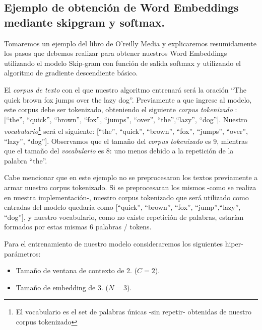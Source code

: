 \documentclass[12pt,a4paper]{article}
\begin{document}
\begin{sloppypar}

\cleardoublepage

\subsection{Ejemplo de obtención de Word Embeddings mediante skipgram y softmax.}\label{anexo_word_emb}

Tomaremos un ejemplo del libro de O’reilly Media\cite{NLP_26} y explicaremos resumidamente los pasos que debemos realizar para obtener nuestros Word Embeddings utilizando el modelo Skip-gram con función de salida softmax y utilizando el algoritmo de gradiente descendiente básico.

El \textit{corpus de texto} con el que nuestro algoritmo entrenará será la oración “The quick brown fox jumps over the lazy dog”. Previamente a que ingrese al modelo, este corpus debe ser tokenizado, obteniendo el siguiente \textit{corpus tokenizado} : [“the”, “quick”, “brown”, “fox”, “jumps”, “over”, “the”,“lazy”, “dog”]. Nuestro \textit{vocabulario}\footnote{El vocabulario es el set de palabras únicas -sin repetir- obtenidas de nuestro corpus tokenizado} será el siguiente: [“the”, “quick”, “brown”, “fox”, “jumps”, “over”, “lazy”, “dog”]. Observamos que el tamaño del \textit{corpus tokenizado} es 9, mientras que el tamaño del \textit{vocabulario} es 8: uno menos debido a la repetición de la palabra “the”. 

Cabe mencionar que en este ejemplo no se preprocesaron los textos previamente a armar nuestro corpus tokenizado. Si se preprocesaran los mismos -como se realiza en nuestra implementación-, nuestro corpus tokenizado que será utilizado como entradas del modelo quedaría como [“quick”, “brown”, “fox”, “jump”,“lazy”, “dog”], y nuestro vocabulario, como no existe repetición de palabras, estarían formados por estas mismas 6 palabras / tokens.

Para el entrenamiento de nuestro modelo consideraremos los siguientes hiper-parámetros:
\begin{itemize}
\item Tamaño de ventana de contexto de 2. ($C=2$).
\item Tamaño de embedding de 3. ($N=3$).
\end{itemize}


\end{sloppypar}
\end{document}
